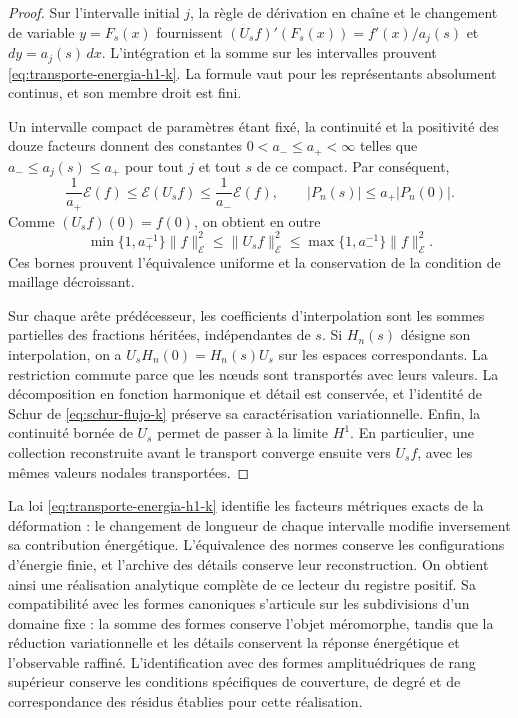 \begin{proof}
Sur l’intervalle initial \(j\), la règle de dérivation en chaîne et le changement
de variable \(y=F_s(x)\) fournissent
\((U_sf)'(F_s(x))=f'(x)/a_j(s)\) et \(dy=a_j(s)\,dx\).
L’intégration et la somme sur les intervalles prouvent
\eqref{eq:transporte-energia-h1-k}. La formule vaut pour les
représentants absolument continus, et son membre droit est fini.

Un intervalle compact de paramètres étant fixé, la continuité et la positivité
des douze facteurs donnent des constantes \(0<a_-\leq a_+<\infty\)
telles que \(a_-\leq a_j(s)\leq a_+\) pour tout \(j\) et
tout \(s\) de ce compact. Par conséquent,
\[
 \frac1{a_+}\mathcal E(f)
 \leq\mathcal E(U_sf)
 \leq\frac1{a_-}\mathcal E(f),
 \qquad
 |P_n(s)|\leq a_+|P_n(0)|.
\]
Comme \((U_sf)(0)=f(0)\), on obtient en outre
\[
 \min\{1,a_+^{-1}\}\|f\|_{\mathcal E}^2
 \leq\|U_sf\|_{\mathcal E}^2
 \leq\max\{1,a_-^{-1}\}\|f\|_{\mathcal E}^2.
\]
Ces bornes prouvent l’équivalence uniforme et la conservation de la
condition de maillage décroissant.

Sur chaque arête prédécesseur, les coefficients d'interpolation sont les sommes partielles des fractions héritées, indépendantes de \(s\). Si \(H_n(s)\) désigne son interpolation, on a \(U_sH_n(0)=H_n(s)U_s\) sur les espaces correspondants. La restriction commute parce que les nœuds sont transportés avec leurs valeurs. La décomposition en fonction harmonique et détail est conservée, et l'identité de Schur de \eqref{eq:schur-flujo-k} préserve sa caractérisation variationnelle. Enfin, la continuité bornée de \(U_s\) permet de passer à la limite \(H^1\). En particulier, une collection reconstruite avant le transport converge ensuite vers \(U_sf\), avec les mêmes valeurs nodales transportées.
\end{proof}

La loi \eqref{eq:transporte-energia-h1-k} identifie les facteurs métriques exacts de la déformation : le changement de longueur de chaque intervalle modifie inversement sa contribution énergétique. L'équivalence des normes conserve les configurations d'énergie finie, et l'archive des détails conserve leur reconstruction. On obtient ainsi une réalisation analytique complète de ce lecteur du registre positif. Sa compatibilité avec les formes canoniques s'articule sur les subdivisions d'un domaine fixe : la somme des formes conserve l'objet méromorphe, tandis que la réduction variationnelle et les détails conservent la réponse énergétique et l'observable raffiné. L'identification avec des formes amplituédriques de rang supérieur conserve les conditions spécifiques de couverture, de degré et de correspondance des résidus établies pour cette réalisation.
